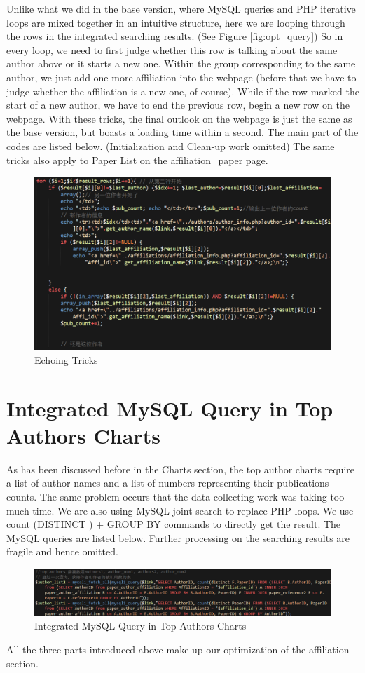\documentclass{book}
\begin{document}
Unlike what we did in the base version, where MySQL queries and PHP iterative loops are mixed together in an intuitive structure, here we are looping through the rows in the integrated searching results. (See Figure \ref{fig:opt_query}) So in every loop, we need to first judge whether this row is talking about the same author above or it starts a new one. Within the group corresponding to the same author, we just add one more affiliation into the webpage (before that we have to judge whether the affiliation is a new one, of course). While if the row marked the start of a new author, we have to end the previous row, begin a new row on the webpage. With these tricks, the final outlook on the webpage is just the same as the base version, but boasts a loading time within a second. The main part of the codes are listed below. (Initialization and Clean-up work omitted) The same tricks also apply to Paper List on the affiliation\_paper page. 


\begin{figure}[H]
\centering{}
\includegraphics[scale=0.45]{img/zlt_opt_code_advanced.png}
\caption{Echoing Tricks}
\end{figure}

\section{Integrated MySQL Query in Top Authors Charts}

As has been discussed before in the Charts section, the top author charts require a list of author names and a list of numbers representing their publications counts. The same problem occurs that the data collecting work was taking too much time. We are also using MySQL joint search to replace PHP loops. We use count (DISTINCT ) + GROUP BY commands to directly get the result. The MySQL queries are listed below. Further processing on the searching results are fragile and hence omitted. 

\begin{figure}[H]
\centering{}
\includegraphics[scale=0.55]{img/zlt_opt_code_chart.png}
\caption{Integrated MySQL Query in Top Authors Charts}
\end{figure}

All the three parts introduced above make up our optimization of the affiliation section.
\end{document}
